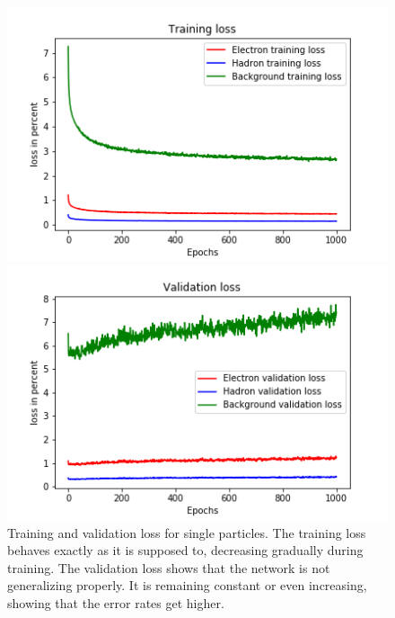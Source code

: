 \begin{figure}
\centering
\begin{minipage}{0.45\textwidth}
\centering
\includegraphics[scale=0.45]{trainloss.png}
\end{minipage}
\begin{minipage}{0.45\textwidth}
\centering
\includegraphics[scale=0.45]{valloss.png}
\end{minipage}
\caption{Training and validation loss for single particles. The training loss behaves exactly as it is supposed to, decreasing gradually during training. The validation loss shows that the network is not generalizing properly. It is remaining constant or even increasing, showing that the error rates get higher.}
\label{trainvalloss}
\end{figure}

